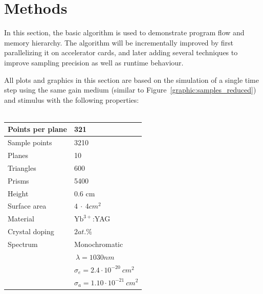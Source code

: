 \section{Methods}
 In this section, the basic algorithm
is used to demonstrate program flow and memory hierarchy. The
algorithm will be incrementally improved by first parallelizing it on
accelerator cards, and later adding several techniques to improve
sampling precision as well as runtime behaviour.

All plots and graphics in this section are based on the simulation of
a single time step using the same gain medium (similar to
Figure~\ref{graphic:samples_reduced}) and stimulus with the following
properties:
\\
\\
\begin{tabular}{| l | l |}
\hline
Points per plane        & 321\\
\hline
Sample points           & 3210\\
\hline
Planes                  & 10\\
\hline
Triangles               & 600\\
\hline
Prisms                  & 5400\\
\hline
Height                  & 0.6 cm\\
\hline
Surface area            & $4~\cdot~4 cm^2$\\
\hline
Material                & $\text{Yb}^{3+}$:YAG\\
\hline
Crystal doping          & $2at.\%$\\
\hline
Spectrum                & Monochromatic\\
                        & $~\lambda = 1030nm$\\
                        & $\sigma_e = 2.4 \cdot 10^{-20}~cm^2$\\ 
                        & $\sigma_a = 1.10 \cdot 10^{-21}~cm^2$\\
\hline
\end{tabular}

